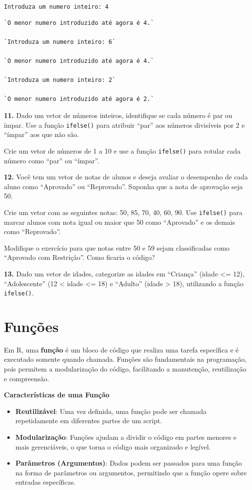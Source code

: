 \documentclass[
]{book}
\providecommand{\tightlist}{%
  \setlength{\itemsep}{0pt}\setlength{\parskip}{0pt}}
\begin{document}
\texttt{Introduza\ um\ numero\ inteiro:\ 4}

\begin{verbatim}
`O menor numero introduzido até agora é 4.`

`Introduza um numero inteiro: 6`

`O menor numero introduzido até agora é 4.`

`Introduza um numero inteiro: 2`

`O menor numero introduzido até agora é 2.`
\end{verbatim}

\textbf{11.} Dado um vetor de números inteiros, identifique se cada número é par ou ímpar. Use a função \texttt{ifelse()} para atribuir ``par'' aos números divisíveis por 2 e ``ímpar'' aos que não são.

Crie um vetor de números de 1 a 10 e use a função \texttt{ifelse()} para rotular cada número como ``par'' ou ``ímpar''.

\textbf{12.} Você tem um vetor de notas de alunos e deseja avaliar o desempenho de cada aluno como ``Aprovado'' ou ``Reprovado''. Suponha que a nota de aprovação seja 50.

Crie um vetor com as seguintes notas: 50, 85, 70, 40, 60, 90. Use \texttt{ifelse()} para marcar alunos com nota igual ou maior que 50 como ``Aprovado'' e os demais como ``Reprovado''.

Modifique o exercício para que notas entre 50 e 59 sejam classificadas como ``Aprovado com Restrição''. Como ficaria o código?

\textbf{13.} Dado um vetor de idades, categorize as idades em ``Criança'' (idade \textless= 12), ``Adolescente'' (12 \textless{} idade \textless= 18) e ``Adulto'' (idade \textgreater{} 18), utilizando a função \texttt{ifelse()}.

\chapter{Funções}\label{funuxe7uxf5es}

Em R, uma \textbf{função} é um bloco de código que realiza uma tarefa
específica e é executado somente quando chamada. Funções são
fundamentais na programação, pois permitem a modularização do código,
facilitando a manutenção, reutilização e compreensão.

\textbf{Características de uma Função}

\begin{itemize}
\tightlist
\item
  \textbf{Reutilizável}: Uma vez definida, uma função pode ser chamada
  repetidamente em diferentes partes de um script.
\item
  \textbf{Modularização}: Funções ajudam a dividir o código em partes
  menores e mais gerenciáveis, o que torna o código mais organizado e
  legível.
\item
  \textbf{Parâmetros (Argumentos)}: Dados podem ser passados para uma
  função na forma de parâmetros ou argumentos, permitindo que a função
  opere sobre entradas específicas.
\end{itemize}
\end{document}
